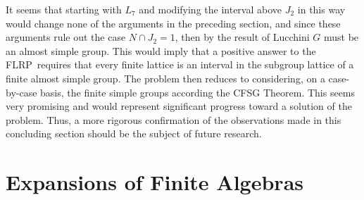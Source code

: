 \documentclass[cm,dissertation,actual,final]{uhthesis}
\theoremstyle{plain}
\theoremstyle{definition}
\theoremstyle{remark}
\numberwithin{theorem}{section}
\numberwithin{claim}{chapter}
\numberwithin{equation}{section}
\numberwithin{conjecture}{chapter}
\newcommand{\<}{\ensuremath{\langle}}
\renewcommand{\>}{\ensuremath{\rangle}}
\newcommand{\FLRP}{{\small FLRP}}
\newcommand{\0}{\ensuremath{\mathbf{0}}}
\newcommand{\1}{\ensuremath{\mathbf{1}}}
\newcommand{\2}{\ensuremath{\mathbf{2}}}
\newcommand{\3}{\ensuremath{\mathbf{3}}}
\newcommand{\4}{\ensuremath{\mathbf{4}}}
\newcommand{\5}{\ensuremath{\mathbf{5}}}
\begin{document}
   {
\begin{center}
\end{center}
   }

It seems that starting with $L_7$ and modifying the interval above $J_2$ in this way would
change none of the arguments in the preceding section, and since these
arguments rule out the case $N\cap J_2 = 1$, %
then by the result of Lucchini $G$ must be an almost simple group.  
This would imply that a positive answer to the \FLRP\ requires that every finite
lattice is an interval in the subgroup lattice of a finite almost simple group.
The problem then reduces to considering, on a case-by-case basis, the finite
simple groups according the {\small CFSG} Theorem.  
This seems very promising and would represent significant progress toward a
solution of the problem. Thus, a more rigorous confirmation of the observations
made in this concluding section should be the subject of future research.


\chapter{Expansions of Finite Algebras}
\label{cha:expans-finite-algebr}
\end{document}
